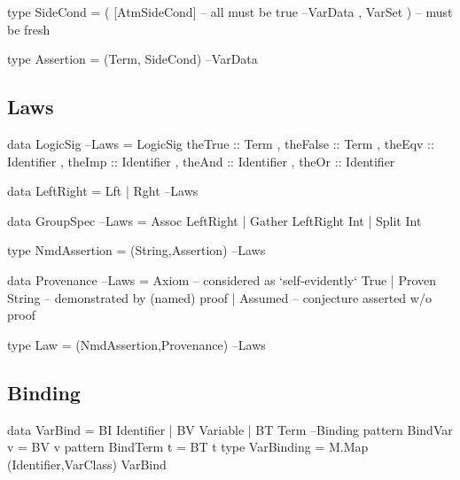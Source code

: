 \begin{code}
type SideCond = ( [AtmSideCond]  -- all must be true                 --VarData
                , VarSet )       -- must be fresh
\end{code}

\begin{code}
type Assertion = (Term, SideCond)                                    --VarData
\end{code}

\subsection{Laws}

\begin{code}
data LogicSig                                                           --Laws
  = LogicSig
     { theTrue  :: Term
     , theFalse :: Term
     , theEqv   :: Identifier
     , theImp   :: Identifier
     , theAnd   :: Identifier
     , theOr    :: Identifier
     }
\end{code}

\begin{code}
data LeftRight = Lft | Rght                                             --Laws

data GroupSpec                                                          --Laws
  = Assoc LeftRight
  | Gather LeftRight Int
  | Split Int
\end{code}

\begin{code}
type NmdAssertion = (String,Assertion)                                  --Laws
\end{code}

\begin{code}
data Provenance                                                         --Laws
  = Axiom          --  considered as `self-evidently` True
  | Proven String  --  demonstrated by (named) proof
  | Assumed        --  conjecture asserted w/o proof
\end{code}

\begin{code}
type Law = (NmdAssertion,Provenance)                                    --Laws
\end{code}

\subsection{Binding}

\begin{code}
data VarBind = BI Identifier | BV Variable | BT Term                 --Binding
pattern BindVar  v  =  BV v
pattern BindTerm t  =  BT t
type VarBinding = M.Map (Identifier,VarClass) VarBind
\end{code}


